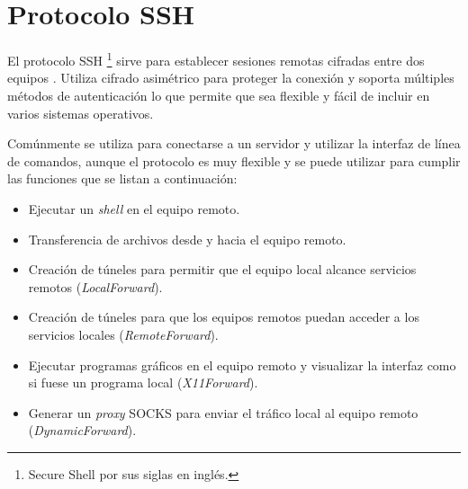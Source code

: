 \newpage
\section {Protocolo \textsc{SSH}}
\label{Protocolo-SSH}
El protocolo \textsc{SSH} \footnote{Secure Shell por sus siglas en ingl\'{e}s.} sirve para establecer sesiones remotas cifradas entre dos equipos \cite{_ssh_????-1}. Utiliza cifrado asim\'{e}trico para proteger la conexi\'{o}n y soporta m\'{u}ltiples m\'{e}todos de autenticaci\'{o}n lo que permite que sea flexible y f\'{a}cil de incluir en varios sistemas operativos.

Com\'{u}nmente se utiliza para conectarse a un servidor y utilizar la interfaz de l\'{i}nea de comandos, aunque el protocolo es muy flexible y se puede utilizar para cumplir las funciones que se listan a continuaci\'{o}n:

  \begin{itemize}
    \item{Ejecutar un \textit{shell} en el equipo remoto.}
    \item{Transferencia de archivos desde y hacia el equipo remoto.}
    \item{Creaci\'{o}n de t\'{u}neles para permitir que el equipo local alcance servicios remotos (\textit{LocalForward}).}
    \item{Creaci\'{o}n de t\'{u}neles para que los equipos remotos puedan acceder a los servicios locales (\textit{RemoteForward}).}
    \item{Ejecutar programas gr\'{a}ficos en el equipo remoto y visualizar la interfaz como si fuese un programa local (\textit{X11Forward}).}
    \item{Generar un \textit{proxy} \textsc{SOCKS} para enviar el tr\'{a}fico local al equipo remoto (\textit{DynamicForward}).}
  \end{itemize}


